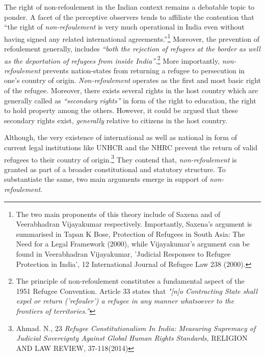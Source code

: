 \begin{multicols}{2}
\vspace{.1cm}

\noi
The right of non-refoulement in the Indian context remains a debatable topic to ponder. A
facet of the perceptive observers tends to affiliate the contention that “the right of \textit{non-refoulement} is very much operational in India even without having signed any related international agreements.”\footnote{The two main proponents of this theory include of Saxena and of Veerabhadran Vijayakumar respectively. Importantly, Saxena's argument is summarised in Tapan K Bose, Protection of Refugees in South Asia: The Need for a Legal Framework (2000), while Vijayakumar's argument can be found in Veerabhadran Vijayakumar, 'Judicial Responses to Refugee Protection in India', 12 International Journal of Refugee Law 238 (2000).}  Moreover, the prevention of refoulement generally, includes \textit{“both the rejection of refugees at the border as well as the deportation of refugees from inside India”}.\footnote{The principle of non-refoulement constitutes a fundamental aspect of the 1951 Refugee
Convention. Article 33 states that \textit{"[n]o Contracting State shall expel or return ('refouler') a refugee in any manner whatsoever to the frontiers of territories.”}} More importantly, \textit{non-refoulement} prevents nation-states from returning a refugee
to persecution in one’s country of origin. \textit{Non-refoulement} operates as the first and most basic
right of the refugee. Moreover, there exists several rights in the host country which are
generally called as \textit{“secondary rights”} in form of the right to education, the right to hold
property among the others. However, it could be argued that these secondary rights exist,
\textit{generally} relative to citizens in the host country.


\noi
Although, the very existence of international as well as national in form of current legal
institutions like UNHCR and the NHRC prevent the return of valid refugees to their country
of origin.\footnote{Ahmad. N., 23 \textit{Refugee Constitutionalism In India: Measuring Supremacy of Judicial Sovereignty Against Global Human Rights Standards,} RELIGION AND LAW REVIEW, 37-118(2014)} They contend that, \textit{non-refoulement} is granted as part of a broader constitutional
and statutory structure. To substantiate the same, two main arguments emerge in support
of \textit{non-refoulement.}



\end{multicols}

